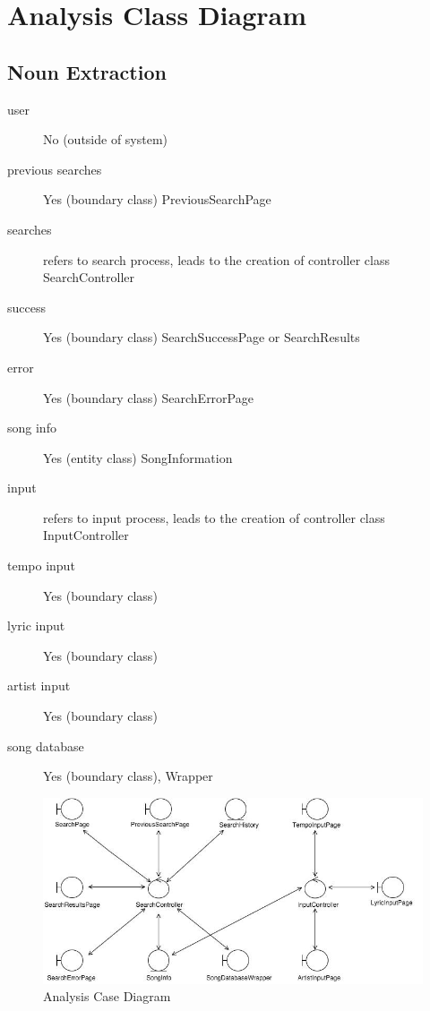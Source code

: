 \documentclass[]{article}
\begin{document}
\section{Analysis Class Diagram}
\label{sec:analysis_class_diagram}
\subsection{Noun Extraction}
\begin{description}
	\item[user] No (outside of system)
	\item[previous searches] Yes (boundary class) PreviousSearchPage
	\item[searches] refers to search process, leads to the creation of controller class SearchController
	\item[success] Yes (boundary class) SearchSuccessPage or SearchResults
	\item[error] Yes (boundary class) SearchErrorPage
	\item[song info] Yes (entity class) SongInformation
	\item[input] refers to input process, leads to the creation of controller class InputController
	\item[tempo input] Yes (boundary class)
	\item[lyric input] Yes (boundary class)
	\item[artist input] Yes (boundary class)
	\item[song database] Yes (boundary class), Wrapper
\end{description}

\begin{figure}[!ht]
	\centering
	\includegraphics[scale=0.7]{Analysis_Class_Diagram.png}
	\caption{Analysis Case Diagram}
\end{figure}
\FloatBarrier
\end{document}
